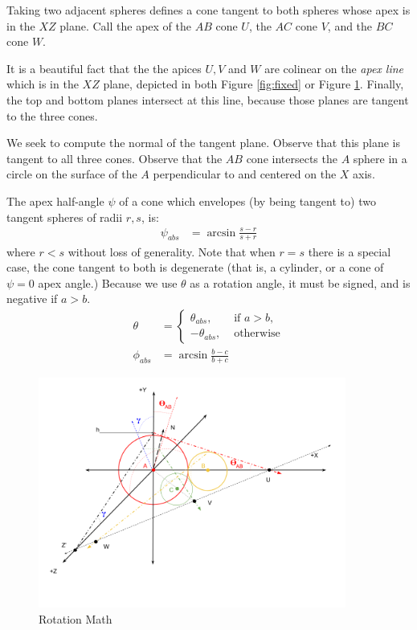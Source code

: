\documentclass{article}
\begin{document}
Taking two adjacent spheres defines a cone tangent to both spheres whose apex is in the $XZ$ plane.
Call the apex of the $AB$ cone $U$, the $AC$ cone $V$, and the $BC$ cone $W$.

It is a beautiful fact that the the apices $U,V$ and $W$ are colinear
on the {\em apex line} which is in the $XZ$ plane, depicted in both Figure \ref{fig:fixed}
or Figure \ref{fig:rotation}.
Finally, the top and bottom planes
intersect at this line, because those planes are tangent to the three cones.


We seek to compute the normal of the tangent plane.
Observe that this plane is tangent to all three cones.
Observe that the $AB$ cone intersects
the $A$ sphere in a circle on the surface of the $A$ perpendicular to and centered on the $X$ axis.

The apex half-angle $\psi$ of a cone which envelopes (by being tangent to) two tangent
spheres of radii $r,s$, is:
\begin{align}
 \psi_{abs} &= \arcsin{\frac{s - r}{s + r}}
\end{align}
where $r < s$ without loss of generality. Note that when $r = s$
there is a special case,
the cone tangent to both is degenerate (that is, a cylinder, or a cone of
$\psi = 0$ apex angle.)
Because we use $\theta$ as a rotation angle, it must be signed, and is
negative if $a > b$.
\begin{align}
  \theta &= \begin{cases}
    \theta_{abs}, & \text{ if $a > b$, } \\
    -\theta_{abs}, & \text{  otherwise}
\end{cases} \label{eq:theta} \\
  \phi_{abs} &= \arcsin{\frac{b - c}{b + c}}
\end{align}


\begin{figure}
     \centering
     \includegraphics[width=0.9\textwidth]{figures/RotationMath.png}
     \caption{Rotation Math}
  \label{fig:rotation}
\end{figure}
\end{document}
